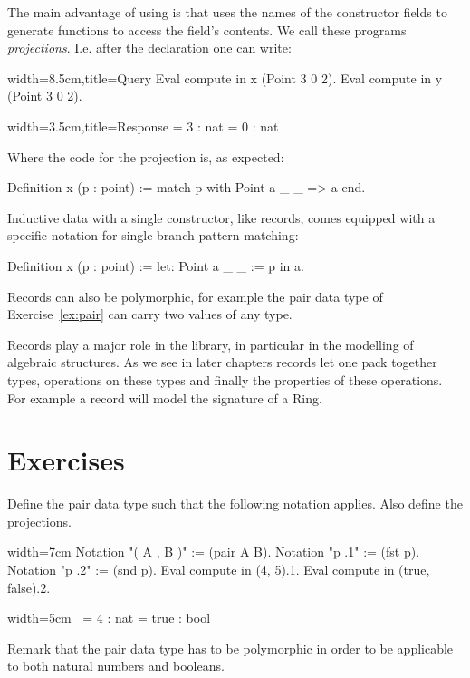 The main advantage of using  is that \Coq{} uses the names of the
constructor fields to generate functions to access the field's contents.  We
call these programs \emph{projections}.  I.e. after the  declaration
one can write:

\begin{coq}{}{width=8.5cm,title=Query}
Eval compute in x (Point 3 0 2).
Eval compute in y (Point 3 0 2).
\end{coq}{}{}
\begin{coqout}{}{width=3.5cm,title=Response}
= 3 : nat
= 0 : nat
\end{coqout}{}{}
Where the code for the  projection is, as expected:

\begin{coq}{}{}
Definition x (p : point) := match p with Point a _ _ => a end.
\end{coq}
Inductive data with a single constructor, like records, comes
equipped with a specific notation for single-branch pattern
matching:

\begin{coq}{}{}
Definition x (p : point) := let: Point a _ _ := p in a.
\end{coq}

Records can also be polymorphic, for example the pair data type of
Exercise~\ref{ex:pair} can carry two values of any type.

Records play a major role in the \mcbMC{} library, in particular
in the modelling of algebraic structures.   As we see in later chapters
records let one pack together types, operations on these types and
finally the properties of these operations.  For example a record
will model the signature of a Ring.  %

\newpage
\section{Exercises}

\begin{Exercise}[label=ex:pair,difficulty=0,title={The pair data type}]
Define the pair data type such that the following notation
applies.  Also define the projections.

\begin{coq}{}{width=7cm}
Notation "( A , B )" := (pair A B).
Notation "p .1" := (fst p).
Notation "p .2" := (snd p).
Eval compute in (4, 5).1.
Eval compute in (true, false).2.
\end{coq}
\begin{coqout}{}{width=5cm}
$~$
     = 4 : nat
     = true : bool
\end{coqout}
Remark that the pair data type has to be polymorphic in order to
be applicable to both natural numbers and booleans.
\end{Exercise}

